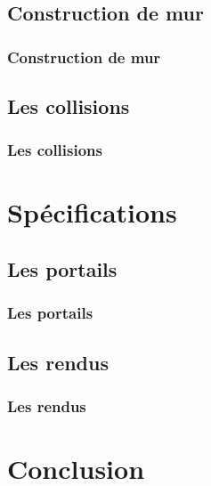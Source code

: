 \documentclass{beamer}
\begin{document}
\subsection{Construction de mur}

\begin{frame}
    \frametitle{Construction de mur}
    \begin{block}{}
    \end{block}
\end{frame}

\subsection{Les collisions}

\begin{frame}
    \frametitle{Les collisions}
    \begin{block}{}
    \end{block}
\end{frame}



\section{Spécifications}
\subsection{Les portails}

\begin{frame}
    \frametitle{Les portails}
    \begin{block}{}
        
    \end{block}
\end{frame}

\subsection{Les rendus}

\begin{frame}
    \frametitle{Les rendus}
    \begin{block}{}
        
    \end{block}
\end{frame}

\section{Conclusion}
\end{document}
